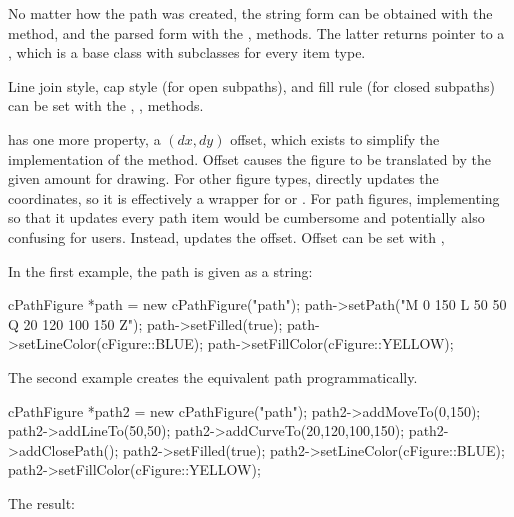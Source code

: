No matter how the path was created, the string form can be obtained with the
 method, and the parsed form with the ,
 methods. The latter returns pointer to a
, which is a base class with subclasses for every
item type.

Line join style, cap style (for open subpaths), and fill rule (for closed
subpaths) can be set with the ,
,  methods.

 has one more property, a $(dx,dy)$ offset, which
exists to simplify the implementation of the  method. Offset
causes the figure to be translated by the given amount for drawing. For
other figure types,  directly updates the coordinates, so it
is effectively a wrapper for  or .
For path figures, implementing  so that it updates every path
item would be cumbersome and potentially also confusing for users. Instead,
 updates the offset. Offset can be set with
,

In the first example, the path is given as a string:


\begin{cpp}
cPathFigure *path = new cPathFigure("path");
path->setPath("M 0 150 L 50 50 Q 20 120 100 150 Z");
path->setFilled(true);
path->setLineColor(cFigure::BLUE);
path->setFillColor(cFigure::YELLOW);
\end{cpp}


The second example creates the equivalent path programmatically.

\begin{cpp}
cPathFigure *path2 = new cPathFigure("path");
path2->addMoveTo(0,150);
path2->addLineTo(50,50);
path2->addCurveTo(20,120,100,150);
path2->addClosePath();
path2->setFilled(true);
path2->setLineColor(cFigure::BLUE);
path2->setFillColor(cFigure::YELLOW);
\end{cpp}


The result:

\begin{center}

\end{center}

